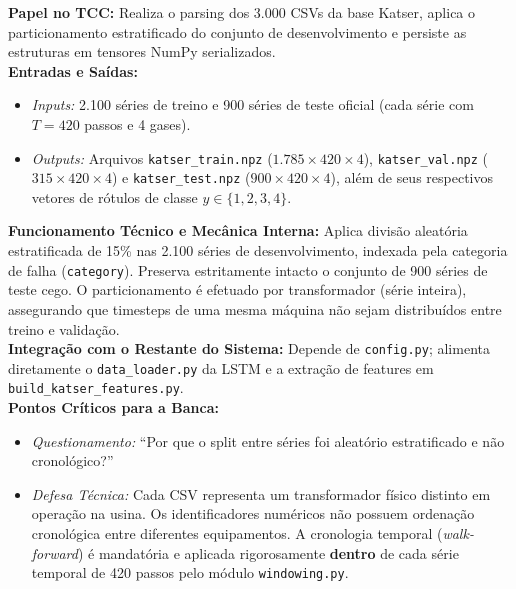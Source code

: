 \documentclass[10pt,a4paper]{article}
\begin{document}
\begin{filebox}
\textbf{Papel no TCC:} Realiza o parsing dos 3.000 CSVs da base Katser, aplica o particionamento estratificado do conjunto de desenvolvimento e persiste as estruturas em tensores NumPy serializados.\\
\textbf{Entradas e Saídas:}
\begin{itemize}[leftmargin=*,itemsep=1pt]
  \item \textit{Inputs:} 2.100 séries de treino e 900 séries de teste oficial (cada série com $T=420$ passos e 4 gases).\\
  \item \textit{Outputs:} Arquivos \texttt{katser\_train.npz} ($1.785 \times 420 \times 4$), \texttt{katser\_val.npz} ($315 \times 420 \times 4$) e \texttt{katser\_test.npz} ($900 \times 420 \times 4$), além de seus respectivos vetores de rótulos de classe $y \in \{1, 2, 3, 4\}$.
\end{itemize}
\textbf{Funcionamento Técnico e Mecânica Interna:} Aplica divisão aleatória estratificada de 15\% nas 2.100 séries de desenvolvimento, indexada pela categoria de falha (\texttt{category}). Preserva estritamente intacto o conjunto de 900 séries de teste cego. O particionamento é efetuado por transformador (série inteira), assegurando que timesteps de uma mesma máquina não sejam distribuídos entre treino e validação.\\
\textbf{Integração com o Restante do Sistema:} Depende de \texttt{config.py}; alimenta diretamente o \texttt{data\_loader.py} da LSTM e a extração de features em \texttt{build\_katser\_features.py}.\\
\textbf{Pontos Críticos para a Banca:}
\begin{itemize}[leftmargin=*,itemsep=1pt]
  \item \textit{Questionamento:} ``Por que o split entre séries foi aleatório estratificado e não cronológico?''
  \item \textit{Defesa Técnica:} Cada CSV representa um transformador físico distinto em operação na usina. Os identificadores numéricos não possuem ordenação cronológica entre diferentes equipamentos. A cronologia temporal (\textit{walk-forward}) é mandatória e aplicada rigorosamente \textbf{dentro} de cada série temporal de 420 passos pelo módulo \texttt{windowing.py}.
\end{itemize}
\end{filebox}
\end{document}
